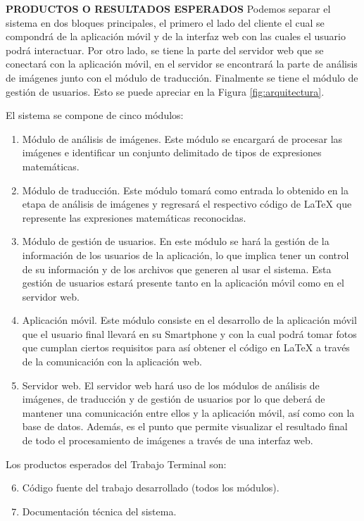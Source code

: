 \newpage

\textbf{PRODUCTOS O RESULTADOS ESPERADOS}
Podemos separar el sistema en dos bloques principales, el primero el lado del cliente el cual se compondrá de la aplicación móvil y de la interfaz web con las cuales el usuario podrá interactuar. Por otro lado, se tiene la parte del servidor web que se conectará con la aplicación móvil, en el servidor se encontrará la parte de análisis de imágenes junto con el módulo de traducción. Finalmente se tiene el módulo de gestión de usuarios. Esto se puede apreciar en la Figura \ref{fig:arquitectura}.%

El sistema se compone de cinco módulos:
\begin{enumerate}
    \item Módulo de análisis de imágenes. Este módulo se encargará de procesar las imágenes e identificar un conjunto delimitado de tipos de expresiones matemáticas.
    \item Módulo de traducción. Este módulo tomará como entrada lo obtenido en la etapa de análisis de imágenes y regresará el respectivo código de LaTeX que represente las expresiones matemáticas reconocidas.
    
    \item Módulo de gestión de usuarios. En este módulo se hará la gestión de la información de los usuarios de la aplicación, lo que implica tener un control de su información y de los archivos que generen al usar el sistema. Esta gestión de usuarios estará presente tanto en la aplicación móvil como en el servidor web.

    \item Aplicación móvil. Este módulo consiste en el desarrollo de la aplicación móvil que el usuario final llevará en su Smartphone y con la cual podrá tomar fotos que cumplan ciertos requisitos para así obtener el código en LaTeX a través de la comunicación con la aplicación web.

    \item Servidor web. El servidor web hará uso de los módulos de análisis de imágenes, de traducción y de gestión de usuarios por lo que deberá de mantener una comunicación entre ellos y la aplicación móvil, así como con la base de datos. Además, es el punto que permite visualizar el resultado final de todo el procesamiento de imágenes a través de una interfaz web.
\end{enumerate}
Los productos esperados del Trabajo Terminal son:
\begin{enumerate}
    \setcounter{enumi}{5}
    \item Código fuente del trabajo desarrollado (todos los módulos).
    \item Documentación técnica del sistema.
\end{enumerate}

